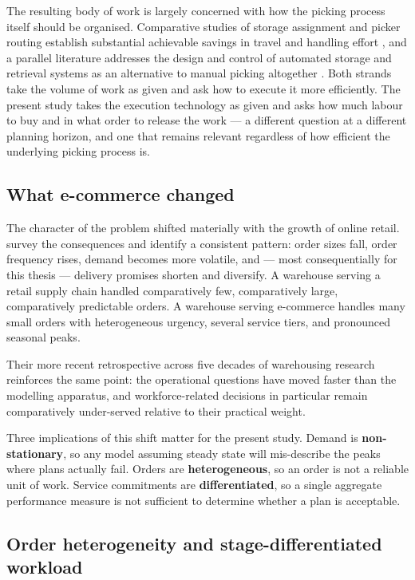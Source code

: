 The resulting body of work is largely concerned with how the picking process itself should be
organised. Comparative studies of storage assignment and picker routing establish substantial
achievable savings in travel and handling effort \citep{petersen2004}, and a parallel literature
addresses the design and control of automated storage and retrieval systems as an alternative to
manual picking altogether \citep{roodbergen2009}. Both strands take the volume of work as given
and ask how to execute it more efficiently. The present study takes the execution technology as
given and asks how much labour to buy and in what order to release the work --- a different
question at a different planning horizon, and one that remains relevant regardless of how
efficient the underlying picking process is.

\subsection{What e-commerce changed}

The character of the problem shifted materially with the growth of online retail.
\citet{boysen2019} survey the consequences and identify a consistent pattern: order sizes fall,
order frequency rises, demand becomes more volatile, and --- most consequentially for this
thesis --- delivery promises shorten and diversify. A warehouse serving a retail supply chain
handled comparatively few, comparatively large, comparatively predictable orders. A warehouse
serving e-commerce handles many small orders with heterogeneous urgency, several service tiers,
and pronounced seasonal peaks.

Their more recent retrospective across five decades of warehousing research
\citep{boysen2025} reinforces the same point: the operational questions have moved faster than
the modelling apparatus, and workforce-related decisions in particular remain comparatively
under-served relative to their practical weight.

Three implications of this shift matter for the present study. Demand is
\textbf{non-stationary}, so any model assuming steady state will mis-describe the peaks where
plans actually fail. Orders are \textbf{heterogeneous}, so an order is not a reliable unit of
work. Service commitments are \textbf{differentiated}, so a single aggregate performance measure
is not sufficient to determine whether a plan is acceptable.

\subsection{Order heterogeneity and stage-differentiated workload}

